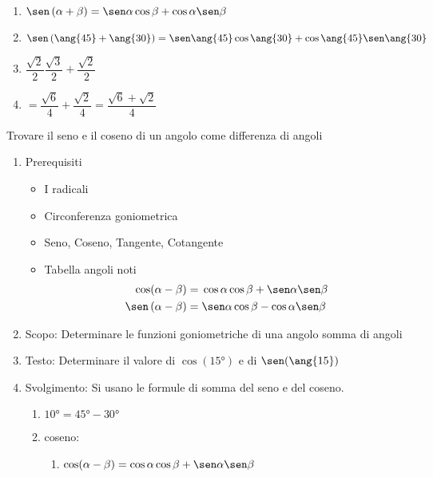 \begin{table}[H]
\begin{enumerate}
\begin{enumerate}
		\begin{enumerate}
			\item $\sen\left(\alpha+\beta\right)=\sen\alpha\cos\beta+\cos\alpha\sen\beta$
			\item $\sen\left(\ang{45}+\ang{30}\right)=\sen\ang{45} \cos\ang{30}+\cos\ang{45}\sen\ang{30} $
			\item $\dfrac{\sqrt{2}}{2}\dfrac{\sqrt{3}}{2}+\dfrac{\sqrt{2}}{2}$
			\item $=\dfrac{\sqrt{6}}{4}+\dfrac{\sqrt{2}}{4}=\dfrac{\sqrt{6}+\sqrt{2}}{4}$
		\end{enumerate}
	\end{enumerate}
\end{enumerate}
\end{table}
\begin{table}[H]
	\caption{Trovare il seno e il coseno di un angolo come differenza di angoli}
	\label{tab:Trovarediffangoli1}
	\begin{enumerate}
		\item Prerequisiti 
		\begin{itemize}
			\item I radicali
			\item Circonferenza goniometrica
			\item Seno, Coseno, Tangente, Cotangente
			\item Tabella angoli noti
			\begin {align*}
			\cos(\alpha-\beta)=	{}&\cos\alpha\cos\beta+\sen\alpha\sen\beta \\ 
			\sen\left(\alpha-\beta\right)={} &\sen\alpha\cos\beta-\cos\alpha\sen\beta\\
		\end{align*}
	\end{itemize}
	\item Scopo: Determinare le funzioni goniometriche di una angolo somma di angoli
	\item Testo: Determinare il valore di $\cos(\ang{15})$ e di $\sen(\ang{15})$
	\item Svolgimento: Si usano le formule di somma  del seno e del coseno.
	\begin{enumerate}
		\item $\ang{10}=\ang{45}-\ang{30}$
		\item coseno:
		\begin{enumerate}
			\item $\cos(\alpha-\beta)=\cos\alpha\cos\beta+\sen\alpha\sen\beta$

\end{enumerate}
\end{enumerate}
\end{enumerate}
\end{table}
